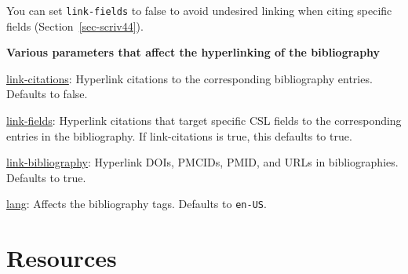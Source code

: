 \documentclass[
  12pt,
  a4paper,
  oneside,
  numbers=noenddot,
  titlepage,
  toclink=all,
  toc=bibliography]{scrbook}
\theoremstyle{definition}
\theoremstyle{definition}
\theoremstyle{definition}
\theoremstyle{plain}
\theoremstyle{plain}
\theoremstyle{plain}
\theoremstyle{plain}
\theoremstyle{plain}
\theoremstyle{remark}
\begin{document}
\begin{tcolorbox}[enhanced jigsaw, rightrule=.15mm, bottomtitle=1mm, colback=white, toptitle=1mm, left=2mm, colbacktitle=quarto-callout-warning-color!10!white, opacitybacktitle=0.6, opacityback=0, arc=.35mm, leftrule=.75mm, toprule=.15mm, titlerule=0mm, breakable, coltitle=black, bottomrule=.15mm, colframe=quarto-callout-warning-color-frame, title=\textcolor{quarto-callout-warning-color}{\faExclamationTriangle}\hspace{0.5em}{Turning off undesired linking}]

You can set \texttt{link-fields} to false to avoid undesired linking
when citing specific fields
(\protect\hypertarget{cite_110}{}{\label{cite_110}Section~\ref{sec-scriv44}}).

\end{tcolorbox}

\begin{tcolorbox}[enhanced jigsaw, rightrule=.15mm, opacityback=0, arc=.35mm, colback=white, toprule=.15mm, breakable, bottomrule=.15mm, left=2mm, colframe=quarto-callout-tip-color-frame, leftrule=.75mm]
\begin{minipage}[t]{5.5mm}
\textcolor{quarto-callout-tip-color}{\faLightbulb}
\end{minipage}%
\begin{minipage}[t]{\textwidth - 5.5mm}

\textbf{Various parameters that affect the hyperlinking of the
bibliography}\vspace{2mm}

\ul{link-citations}: Hyperlink citations to the corresponding
bibliography entries. Defaults to false.

\ul{link-fields}: Hyperlink citations that target specific CSL fields to
the corresponding entries in the bibliography. If link-citations is
true, this defaults to true.

\ul{link-bibliography}: Hyperlink DOIs, PMCIDs, PMID, and URLs in
bibliographies. Defaults to true.

\ul{lang}: Affects the bibliography tags. Defaults to \texttt{en-US}.

\end{minipage}%
\end{tcolorbox}

\hypertarget{sec-scriv52}{%
\chapter{Resources}\label{sec-scriv52}}
\end{document}
